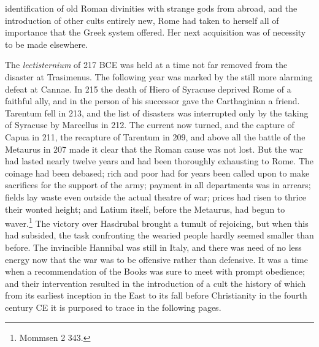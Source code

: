 \documentclass[a4paper, 11pt, oneside, polutonikogreek, english]{article}
\begin{document}
identification of old Roman divinities with strange gods from abroad, and the introduction of other cults entirely new, Rome had taken to herself all of importance that the Greek system offered. Her next acquisition was of necessity to be made elsewhere.

The \emph{lectisternium} of 217 \textsc{BCE} was held at a time not far removed from the disaster at Trasimenus. The following year was marked by the still more alarming defeat at Cannae. In 215 the death of Hiero of Syracuse deprived Rome of a faithful ally, and in the person of his successor gave the Carthaginian a friend. Tarentum fell in 213, and the list of disasters was interrupted only by the taking of Syracuse by Marcellus in 212. The current now turned, and the capture of Capua in 211, the recapture of Tarentum in 209, and above all the battle of the Metaurus in 207 made it clear that the Roman cause was not lost. But the war had lasted nearly twelve years and had been thoroughly exhausting to Rome. The coinage had been debased; rich and poor had for years been called upon to make sacrifices for the support of the army; payment in all departments was in arrears; fields lay waste even outside the actual theatre of war; prices had risen to thrice their wonted height; and Latium itself, before the Metaurus, had begun to waver.\footnote{Mommsen 2 343.} The victory over Hasdrubal brought a tumult of rejoicing, but when this had subsided, the task confronting the wearied people hardly seemed smaller than before. The invincible Hannibal was still in Italy, and there was need of no less energy now that the war was to be offensive rather than defensive. It was a time when a recommendation of the Books was sure to meet with prompt obedience; and their intervention resulted in the introduction of a cult the history of which from its earliest inception in the East to its fall before Christianity in the fourth century \textsc{CE} it is purposed to trace in the following pages.
\end{document}
